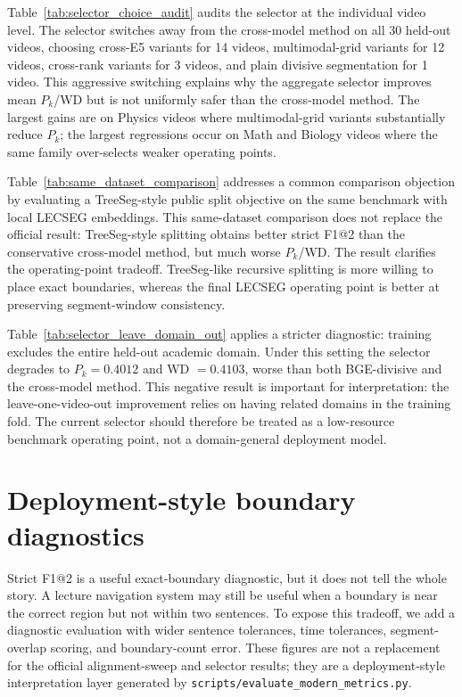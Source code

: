 

Table~\ref{tab:selector_choice_audit} audits the selector at the individual
video level. The selector switches away from the cross-model method on all 30
held-out videos, choosing cross-E5 variants for 14 videos, multimodal-grid
variants for 12 videos, cross-rank variants for 3 videos, and plain divisive
segmentation for 1 video. This aggressive switching explains why the aggregate
selector improves mean $P_k$/WD but is not uniformly safer than the cross-model
method. The largest gains are on Physics videos where multimodal-grid variants
substantially reduce $P_k$; the largest regressions occur on Math and Biology
videos where the same family over-selects weaker operating points.



Table~\ref{tab:same_dataset_comparison} addresses a common comparison
objection by evaluating a TreeSeg-style public split objective on the same
\dataset{} benchmark with local LECSEG embeddings. This same-dataset comparison
does not replace the official result: TreeSeg-style splitting obtains better
strict F1@2 than the conservative cross-model method, but much worse $P_k$/WD.
The result clarifies the operating-point tradeoff. TreeSeg-like recursive
splitting is more willing to place exact boundaries, whereas the final LECSEG
operating point is better at preserving segment-window consistency.



Table~\ref{tab:selector_leave_domain_out} applies a stricter diagnostic:
training excludes the entire held-out academic domain. Under this setting the
selector degrades to $P_k=0.4012$ and WD $=0.4103$, worse than both
BGE-divisive and the cross-model method. This negative result is important for
interpretation: the leave-one-video-out improvement relies on having related
domains in the training fold. The current selector should therefore be treated
as a low-resource benchmark operating point, not a domain-general deployment model.

\section{Deployment-style boundary diagnostics}
\label{sec:modern_metrics}

Strict F1@2 is a useful exact-boundary diagnostic, but it does not tell the
whole story. A lecture navigation system may still be useful when a boundary
is near the correct region but not within two sentences. To expose this
tradeoff, we add a diagnostic evaluation with wider sentence tolerances,
time tolerances, segment-overlap scoring, and boundary-count error. These
figures are not a replacement for the official alignment-sweep and selector
results; they are a deployment-style interpretation layer generated by
\texttt{scripts/evaluate\_modern\_metrics.py}.

